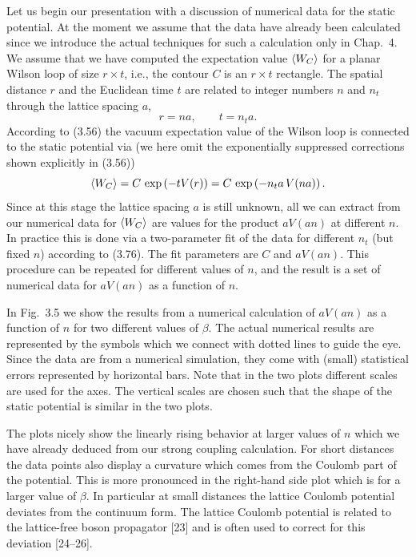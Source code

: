 Let us begin our presentation with a discussion of numerical data for the
static potential. At the moment we assume that the data have already been
calculated since we introduce the actual techniques for such a calculation only
in Chap.~4. We assume that we have computed the expectation value $\left\langle W_C \right\rangle$
for a planar Wilson loop of size $r \times t$, i.e., the contour $C$ is an
$r \times t$ rectangle. The spatial distance $r$ and the Euclidean time $t$ are
related to integer numbers $n$ and $n_t$ through the lattice spacing $a$,
\begin{equation}
  r = n a , \qquad t = n_t a .
\end{equation}
According to (3.56) the vacuum expectation value of the Wilson loop is
connected to the static potential via (we here omit the exponentially
suppressed corrections shown explicitly in (3.56))
\begin{equation}
  \left\langle W_C \right\rangle = C\,\exp\left(-t V(r)\right)
  = C\,\exp\left(-n_t a\,V(na)\right) .
\end{equation}
Since at this stage the lattice spacing $a$ is still unknown, all we can extract
from our numerical data for $\left\langle W_C \right\rangle$ are values for the product $aV(an)$ at
different $n$. In practice this is done via a two-parameter fit of the data for
different $n_t$ (but fixed $n$) according to (3.76). The fit parameters are $C$
and $aV(an)$. This procedure can be repeated for different values of $n$, and
the result is a set of numerical data for $aV(an)$ as a function of $n$.

In Fig.~3.5 we show the results from a numerical calculation of $aV(an)$ as a
function of $n$ for two different values of $\beta$. The actual numerical
results are represented by the symbols which we connect with dotted lines to
guide the eye. Since the data are from a numerical simulation, they come with
(small) statistical errors represented by horizontal bars. Note that in the two
plots different scales are used for the axes. The vertical scales are chosen
such that the shape of the static potential is similar in the two plots.

The plots nicely show the linearly rising behavior at larger values of $n$
which we have already deduced from our strong coupling calculation. For short
distances the data points also display a curvature which comes from the Coulomb
part of the potential. This is more pronounced in the right-hand side plot
which is for a larger value of $\beta$. In particular at small distances the
lattice Coulomb potential deviates from the continuum form. The lattice Coulomb
potential is related to the lattice-free boson propagator [23] and is often
used to correct for this deviation [24--26].


